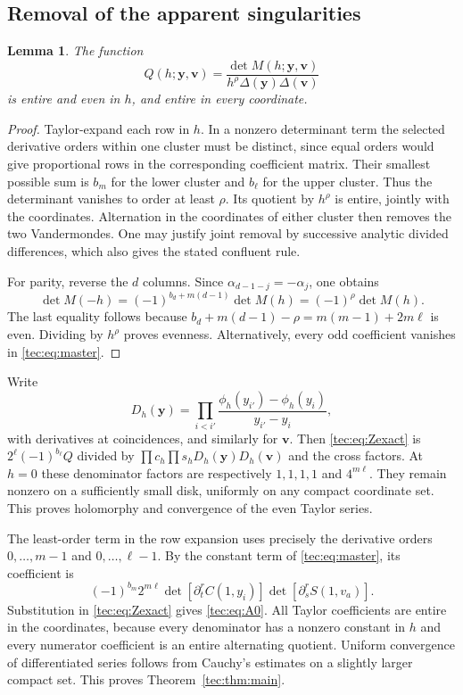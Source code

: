 \documentclass[11pt,a4paper]{article}
\numberwithin{equation}{section}
\newtheorem{lemma}[theorem]{Lemma}
\theoremstyle{definition}
\theoremstyle{remark}
\newcommand{\by}{\boldsymbol{y}}
\newcommand{\Del}{\Delta}
\newcommand{\bv}{\boldsymbol v}
\begin{document}
\subsection{Removal of the apparent singularities}
\begin{lemma}\label{tec:lem:analyticQ}
The function
\begin{equation}\label{tec:eq:Q}
 Q(h;\by,\bv)=\frac{\det M(h;\by,\bv)}
                        {h^\rho\Del(\by)\Del(\bv)}
\end{equation}
is entire and even in $h$, and entire in every coordinate.
\end{lemma}
\begin{proof}
Taylor-expand each row in $h$. In a nonzero determinant term the selected
derivative orders within one cluster must be distinct, since equal
orders would give proportional rows in the corresponding coefficient
matrix. Their smallest possible sum is $b_m$ for the lower cluster and
$b_\ell$ for the upper cluster. Thus the determinant vanishes to order
at least $\rho$. Its quotient by $h^\rho$ is entire, jointly with the
coordinates. Alternation in the coordinates of either cluster then
removes the two Vandermondes. One may justify joint removal by successive
analytic divided differences, which also gives the stated confluent rule.

For parity, reverse the $d$ columns. Since
$\alpha_{d-1-j}=-\alpha_j$, one obtains
\[
 \det M(-h)=(-1)^{b_d+m(d-1)}\det M(h)=(-1)^\rho\det M(h).
\]
The last equality follows because
$b_d+m(d-1)-\rho=m(m-1)+2m\ell$ is even. Dividing by $h^\rho$
proves evenness. Alternatively, every odd coefficient vanishes in
\eqref{tec:eq:master}.
\end{proof}

Write
\begin{equation}\label{tec:eq:Dphi}
 D_h(\by)=\prod_{i<i'}
 \frac{\phi_h(y_{i'})-\phi_h(y_i)}{y_{i'}-y_i},
\end{equation}
with derivatives at coincidences, and similarly for $\bv$.
Then \eqref{tec:eq:Zexact} is $2^\ell(-1)^{b_\ell}Q$ divided by
$\prod c_h\prod s_hD_h(\by)D_h(\bv)$ and the cross factors.
At $h=0$ these denominator factors are respectively $1,1,1,1$ and
$4^{m\ell}$. They remain nonzero on a sufficiently small disk,
uniformly on any compact coordinate set. This proves holomorphy and
convergence of the even Taylor series.

The least-order term in the row expansion uses precisely the derivative
orders $0,\ldots,m-1$ and $0,\ldots,\ell-1$. By the constant term of
\eqref{tec:eq:master}, its coefficient is
\[
 (-1)^{b_m}2^{m\ell}
 \det[\partial_t^r C(1,y_i)]\det[\partial_s^r S(1,v_a)].
\]
Substitution in \eqref{tec:eq:Zexact} gives \eqref{tec:eq:A0}. All Taylor
coefficients are entire in the coordinates, because every denominator
has a nonzero constant in $h$ and every numerator coefficient is an
entire alternating quotient. Uniform convergence of differentiated
series follows from Cauchy's estimates on a slightly larger compact set.
This proves Theorem~\ref{tec:thm:main}.
\end{document}
